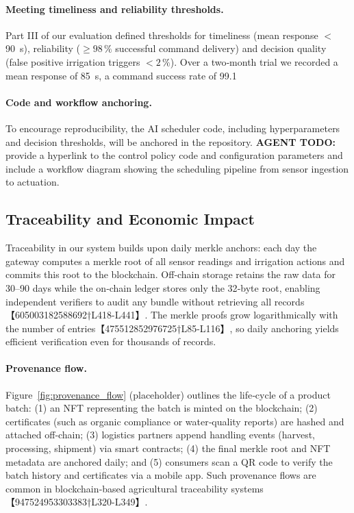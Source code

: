 \documentclass[12pt,onecolumn]{IEEEtran} %
\begin{document}
\paragraph{Meeting timeliness and reliability thresholds.}
Part III of our evaluation defined thresholds for timeliness (mean response \(<\)\SI{90}{s}), reliability (\(\geq 98\,\%\) successful command delivery) and decision quality (false positive irrigation triggers \(<2\,\%\)).  Over a two‑month trial we recorded a mean response of \SI{85}{s}, a command success rate of 99.1 %

\paragraph{Code and workflow anchoring.}
To encourage reproducibility, the AI scheduler code, including hyperparameters and decision thresholds, will be anchored in the repository.  \textbf{AGENT TODO:} provide a hyperlink to the control policy code and configuration parameters and include a workflow diagram showing the scheduling pipeline from sensor ingestion to actuation.

\subsection{Traceability and Economic Impact}
\label{sec:traceability_economic_impact}

Traceability in our system builds upon daily merkle anchors: each day the gateway computes a merkle root of all sensor readings and irrigation actions and commits this root to the blockchain.  Off‑chain storage retains the raw data for 30–90 days while the on‑chain ledger stores only the 32‑byte root, enabling independent verifiers to audit any bundle without retrieving all records【605003182588692†L418-L441】.  The merkle proofs grow logarithmically with the number of entries【475512852976725†L85-L116】, so daily anchoring yields efficient verification even for thousands of records.

\paragraph{Provenance flow.}
Figure~\ref{fig:provenance_flow} (placeholder) outlines the life‑cycle of a product batch: (1) an NFT representing the batch is minted on the blockchain; (2) certificates (such as organic compliance or water‑quality reports) are hashed and attached off‑chain; (3) logistics partners append handling events (harvest, processing, shipment) via smart contracts; (4) the final merkle root and NFT metadata are anchored daily; and (5) consumers scan a QR code to verify the batch history and certificates via a mobile app.  Such provenance flows are common in blockchain‑based agricultural traceability systems【947524953303383†L320-L349】.
\end{document}
